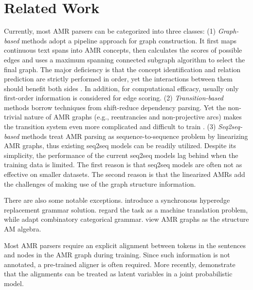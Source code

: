 \documentclass[11pt,a4paper]{article}
\begin{document}
	\section{Related Work}
	\label{related}
	Currently, most AMR parsers can be categorized into three classes: (1) \textit{Graph-based} methods \cite{flanigan2014discriminative,flanigan2016cmu,werling2015robust,foland2017abstract,lyu2018amr,zhang-etal-2019-amr} adopt a pipeline approach for graph construction. It first maps continuous text spans into AMR concepts, then calculates the scores of possible edges and uses a maximum spanning connected subgraph algorithm to select the final graph. The major deficiency is that the concept identification and relation prediction are strictly performed in order, yet the interactions between them should benefit both sides \cite{zhou-etal-2016-amr}. In addition, for computational efficacy, usually only first-order information is considered for edge scoring.  (2) \textit{Transition-based} methods \cite{wang2016camr,damonte2016incremental,wang2017getting,ballesteros2017amr,liu2018amr,peng2018amr,guo2018better,naseem-etal-2019-rewarding} borrow techniques from shift-reduce dependency parsing. Yet the non-trivial nature of AMR graphs (e.g., reentrancies and non-projective arcs) makes the transition system even more complicated and difficult to train \cite{guo2018better}. (3) \textit{Seq2seq-based} methods \cite{barzdins2016riga,peng-etal-2017-addressing,konstas2017neural,van2017neural} treat AMR parsing as sequence-to-sequence problem by linearizing AMR graphs, thus existing seq2seq models \cite{bahdanau2014neural,luong-pham-manning:2015:EMNLP} can be readily utilized. Despite its simplicity, the performance of the current seq2seq models lag behind when the training data is limited. The first reason is that seq2seq models are often not as effective on smaller datasets. The second reason is that the linearized AMRs add the challenges of making use of the graph structure information.
	
	There are also some notable exceptions.  introduce a synchronous hyperedge replacement grammar solution.  regard the task as a machine translation problem, while  adapt combinatory categorical grammar.  view AMR graphs as the structure AM algebra.
	
	Most AMR parsers require an explicit alignment between tokens in the sentences and nodes in the AMR graph during training. Since such information is not annotated, a pre-trained aligner \cite{flanigan2014discriminative,pourdamghani2014aligning,liu2018amr}  is often required. More recently,  demonstrate that the alignments can be treated as latent variables in a joint probabilistic model.
\end{document}
